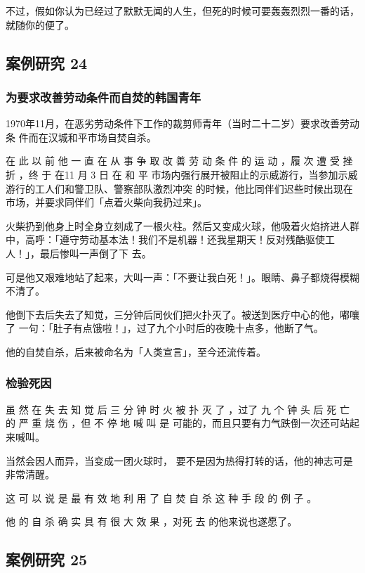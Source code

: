 \documentclass[UTF8]{ctexart}
\begin{document}
不过，假如你认为已经过了默默无闻的人生，但死的时候可要轰轰烈烈一番的话，就随你的便了。


\subsection{案例研究 24}

\subsubsection*{为要求改善劳动条件而自焚的韩国青年}

1970年11月，在恶劣劳动条件下工作的裁剪师青年（当时二十二岁）要求改善劳动条
件而在汉城和平市场自焚自杀。

在 此 以 前 他 一 直 在 从 事 争 取 改 善 劳 动 条 件 的 运 动 ，履 次 遭 受 挫 折 ，终 于 在11 月 3 日 在 和 平 市场内强行展开被阻止的示威游行，当参加示威游行的工人们和警卫队、警察部队激烈冲突 的时候，他比同伴们迟些时候出现在市场，并要求同伴们「点着火柴向我扔过来」。

火柴扔到他身上时全身立刻成了一根火柱。然后又变成火球，他吸着火焰挤进人群中，高呼：「遵守劳动基本法！我们不是机器！还我星期天！反对残酷驱使工人！」，最后惨叫一声倒了下 去。

可是他又艰难地站了起来，大叫一声：「不要让我白死！」。眼睛、鼻子都烧得模糊不清了。

他倒下去后失去了知觉，三分钟后同伙们把火扑灭了。被送到医疗中心的他，嘟嚷了 一句：「肚子有点饿啦！」，过了九个小时后的夜晚十点多，他断了气。

他的自焚自杀，后来被命名为「人类宣言」，至今还流传着。

\subsubsection*{检验死因}

虽 然 在 失 去 知 觉 后 三 分 钟 时 火 被 扑 灭 了 ，过了 九 个 钟 头 后 死 亡 的 严 重 烧 伤 ，但 不 停 地 喊 叫 是 可能的，而且只要有力气跌倒一次还可站起来喊叫。

当然会因人而异，当变成一团火球时， 要不是因为热得打转的话，他的神志可是非常清醒。 

这 可 以 说 是 最 有 效 地 利 用 了 自 焚 自 杀 这 种 手 段 的 例 子 。

他 的 自 杀 确 实 具 有 很 大 效 果 ，对死 去 的他来说也遂愿了。

\subsection{案例研究 25}
\end{document}
